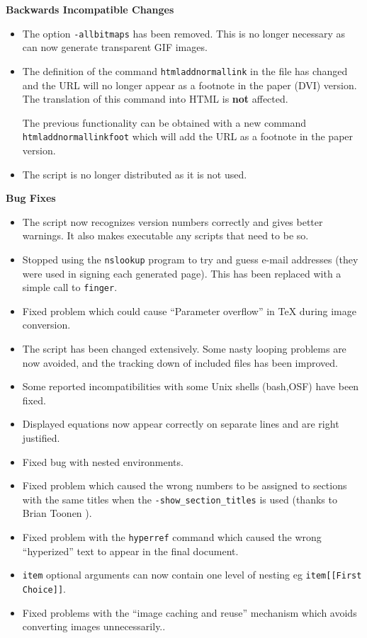 \begin{htmllist}
\item[\textbf{Backwards Incompatible Changes}] \hfill
\begin{itemize}
\item The option \texttt{-allbitmaps} has been removed. This is no
longer necessary as \latextohtml{} can now generate transparent
GIF images.
\item The definition of the command \texttt{htmladdnormallink} in the 
file  has changed and the URL will no longer appear
as a footnote in the paper (DVI) version. The translation of
this command into HTML is \textbf{not} affected. 

The previous functionality can be obtained with a new command
\texttt{htmladdnormallinkfoot} which will add the URL as a footnote
in the paper version.
\item The script  is no longer distributed as it is not
used.

\end{itemize}

\item[\textbf{Bug Fixes}] \hfill
\begin{itemize}
\item The  script now recognizes version
numbers correctly and gives better warnings. It also makes
executable any scripts that need to be so. 
\item Stopped using the \texttt{nslookup} program to try and guess
e-mail addresses (they were used in signing each generated page). 
This has been replaced with a simple call 
to \texttt{finger}.
\item Fixed problem which could cause ``Parameter overflow'' in 
TeX during image conversion.
\item The  script has been changed extensively.
Some nasty looping problems are now avoided, and the tracking
down of included files has been improved.
\item Some reported incompatibilities with some Unix shells
(bash,OSF) have been fixed.
\item Displayed equations now appear correctly on separate
lines and are right justified.
\item Fixed bug with nested environments.
\item Fixed problem which caused the wrong numbers to be assigned
to sections with the same titles when the \texttt{-show\_section\_titles}
is used (thanks to Brian  Toonen ).
\item Fixed problem with the \texttt{hyperref} command which
caused the wrong ``hyperized'' text to appear in the final document.
\item \texttt{item} optional arguments can now contain one level of
nesting eg \texttt{item[[First Choice]]}.
\item Fixed problems with the ``image caching and reuse'' mechanism 
which avoids converting images unnecessarily..
\end{itemize}


\end{htmllist}
